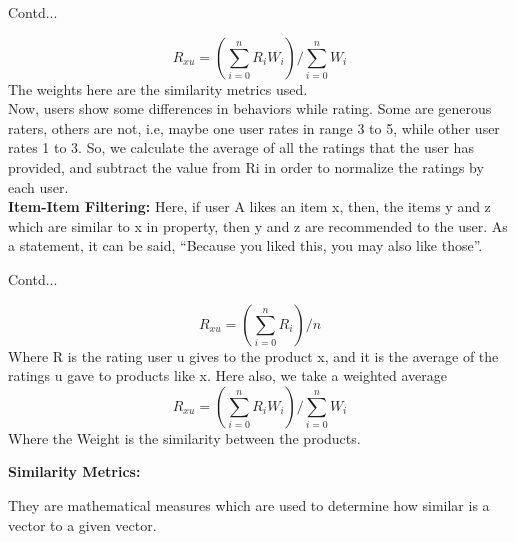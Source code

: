 \documentclass{beamer}
\newcommand\myheading[1]{%
  \par\bigskip
  {\large\bfseries#1}\par\smallskip}
\begin{document}
\begin{frame}{Contd...}
	\begin{flushleft}
		\begin{equation*}
			R_{xu} = (\sum_{i=0}^{n} R_iW_i) / \sum_{i=0}^{n} W_i
		\end{equation*}
		The weights here are the similarity metrics used.\\
		\vspace{10pt}
		Now, users show some differences in behaviors while rating. Some are generous raters, others are not, i.e, maybe one user rates in range 3 to 5, while other user rates 1 to 3. So, we calculate the average of all the ratings that the user has provided, and subtract the value from Ri in order to normalize the ratings by each user.\\
		\vspace{10pt}
		\textbf{Item-Item Filtering:}
		Here, if user A likes an item x, then, the items y and z which are similar to x in property, then y and z are recommended to the user. As a statement, it can be said, “Because you liked this, you may also like those”.
	\end{flushleft}
\end{frame}

\begin{frame}{Contd...}
	\begin{flushleft}
		\begin{equation*}
			R_{xu} = (\sum_{i=0}^{n} R_i) / n
		\end{equation*}
		Where R is the rating user u gives to the product x, and it is the average of the ratings u gave to products like x. Here also, we take a weighted average
		\begin{equation*}
			R_{xu} = (\sum_{i=0}^{n} R_iW_i) / \sum_{i=0}^{n} W_i
		\end{equation*}
		Where the Weight is the similarity between the products.
		\myheading{Similarity Metrics:}
		They are mathematical measures which are used to determine how similar is a vector to a given vector.
	\end{flushleft}
\end{frame}
\end{document}
